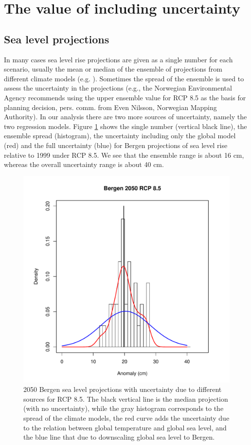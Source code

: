 \documentclass[draft,linenumbers]{agujournal}
\begin{document}
\section{The value of including uncertainty}
\label{unc}

\subsection{Sea level projections}

In many cases sea level rise projections are given as a single number for each scenario, usually the mean or median of the ensemble of projections from different climate models (e.g. \citet{climateimpactgroup}). Sometimes the spread of the ensemble is used to assess the uncertainty in the projections (e.g., the Norwegian Environmental Agency recommends using the upper ensemble value for RCP 8.5 as the basis for planning decision, pers. comm. from Even Nilsson, Norwegian Mapping Authority). In our analysis there are two more sources of uncertainty, namely the two regression models. Figure \ref{fig:unc} shows the single number (vertical black line), the ensemble spread (histogram), the uncertainty including only the global model (red) and the full uncertainty (blue) for Bergen projections of sea level rise relative to 1999 under RCP 8.5. We see that the ensemble range is about 16 cm, whereas the overall uncertainty range is about 40 cm.


\begin{figure}[!hbpt]
\begin{center}
\includegraphics[width=0.5\linewidth]{unc.pdf}
\caption{2050 Bergen sea level projections with uncertainty due to different sources for RCP 8.5. The black vertical line is the median projection (with no uncertainty), while the gray histogram corresponds to the spread of the climate models, the red curve adds the uncertainty due to the relation between global temperature and global sea level, and the blue line that due to downscaling global sea level to Bergen. } 
\label{fig:unc}
\end{center}
\end{figure}
\end{document}
